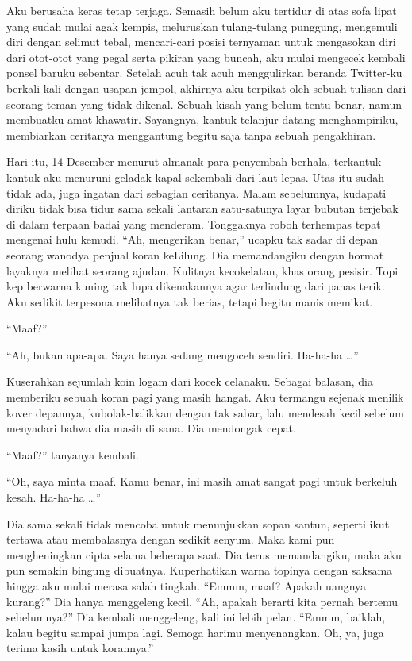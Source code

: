 \documentclass[smalldemyvopaper,11pt,twoside,onecolumn,openright,extrafontsizes]{memoir}
\begin{document}

Aku berusaha keras tetap terjaga. Semasih belum aku tertidur di atas sofa lipat yang sudah mulai agak kempis, meluruskan tulang-tulang punggung, mengemuli diri dengan selimut tebal, mencari-cari posisi ternyaman untuk mengasokan diri dari otot-otot yang pegal serta pikiran yang buncah, aku mulai mengecek kembali ponsel baruku sebentar. Setelah acuh tak acuh menggulirkan beranda Twitter-ku berkali-kali dengan usapan jempol, akhirnya aku terpikat oleh sebuah tulisan dari seorang teman yang tidak dikenal. Sebuah kisah yang belum tentu benar, namun membuatku amat khawatir. Sayangnya, kantuk telanjur datang menghampiriku, membiarkan ceritanya menggantung begitu saja tanpa sebuah pengakhiran.


Hari itu, 14 Desember menurut almanak para penyembah berhala, terkantuk-kantuk aku menuruni geladak kapal sekembali dari laut lepas. Utas itu sudah tidak ada, juga ingatan dari sebagian ceritanya. Malam sebelumnya, kudapati diriku tidak bisa tidur sama sekali lantaran satu-satunya layar bubutan terjebak di dalam terpaan badai yang menderam. Tonggaknya roboh terhempas tepat mengenai hulu kemudi. ``Ah, mengerikan benar,'' ucapku tak sadar di depan seorang wanodya penjual koran keLilung. Dia memandangiku dengan hormat layaknya melihat seorang ajudan. Kulitnya kecokelatan, khas orang pesisir. Topi kep berwarna kuning tak lupa dikenakannya agar terlindung dari panas terik. Aku sedikit terpesona melihatnya tak berias, tetapi begitu manis memikat.

``Maaf?''

``Ah, bukan apa-apa. Saya hanya sedang mengoceh sendiri. Ha-ha-ha \dots''

Kuserahkan sejumlah koin logam dari kocek celanaku. Sebagai balasan, dia memberiku sebuah koran pagi yang masih hangat. Aku termangu sejenak menilik kover depannya, kubolak-balikkan dengan tak sabar, lalu mendesah kecil sebelum menyadari bahwa dia masih di sana. Dia mendongak cepat.

``Maaf?'' tanyanya kembali.


``Oh, saya minta maaf. Kamu benar, ini masih amat sangat pagi untuk berkeluh kesah. Ha-ha-ha \dots''


Dia sama sekali tidak mencoba untuk menunjukkan sopan santun, seperti ikut tertawa atau membalasnya dengan sedikit senyum. Maka kami pun mengheningkan cipta selama beberapa saat. Dia terus memandangiku, maka aku pun semakin bingung dibuatnya. Kuperhatikan warna topinya dengan saksama hingga aku mulai merasa salah tingkah. ``Emmm, maaf? Apakah uangnya kurang?'' Dia hanya menggeleng kecil. ``Ah, apakah berarti kita pernah bertemu sebelumnya?'' Dia kembali menggeleng, kali ini lebih pelan. ``Emmm, baiklah, kalau begitu sampai jumpa lagi. Semoga harimu menyenangkan. Oh, ya, juga terima kasih untuk korannya.''
\end{document}
